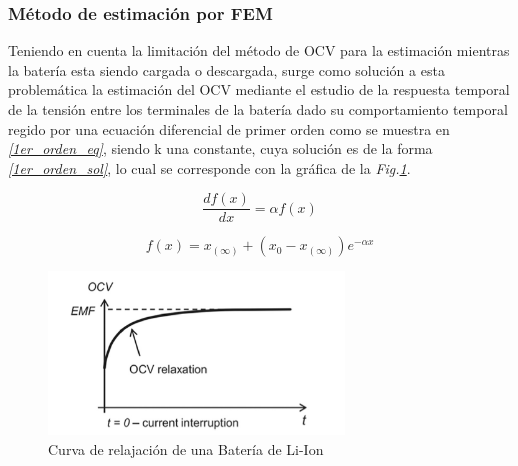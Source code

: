 \documentclass[10pt,a4paper]{article}
\begin{document}
\subsubsection{Método de estimación por FEM}
Teniendo en cuenta la limitación del método de OCV para la estimación mientras la batería esta siendo cargada o descargada, surge como solución a esta problemática la estimación del OCV mediante el estudio de la respuesta temporal de la tensión entre los terminales de la batería dado su comportamiento temporal regido por una ecuación diferencial de primer orden como se muestra en \emph{\ref{1er_orden_eq}}, siendo k una constante, cuya solución es de la forma \emph{\ref{1er_orden_sol}}, lo cual se corresponde con la gráfica de la \emph{Fig.\ref{EMF_Method}}.

\begin{figure}[h!]
	\begin{center}
		\begin{equation}
		\frac{df(x)}{dx} = \alpha f(x)
		\label{1er_orden_eq}
		\end{equation}	
	\end{center}
\end{figure}

\begin{figure}[h!]
	\begin{center}
		\begin{equation}
		f(x)= x_{(\infty)}+(x_0-x_{(\infty)})e^{-\alpha x}
		\label{1er_orden_sol}
		\end{equation}	
	\end{center}
\end{figure}

\begin{figure}[h!]
	\begin{center}
		\includegraphics[width=0.7\textwidth]{EMF_Relaxation.png}
		\caption{Curva de relajación de una Batería de Li-Ion}
		\label{EMF_Method}
	\end{center}
\end{figure}
\end{document}
